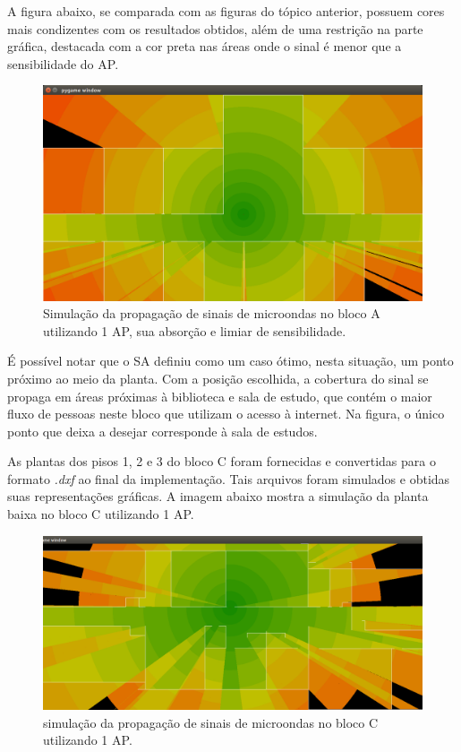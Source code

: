 \documentclass[
	12pt,				%
	openright,			%
	twoside,			%
	a4paper,			%
	english,			%
	french,				%
	spanish,			%
	brazil				%
	]{abntex2}
\begin{document}
A figura abaixo, se comparada com as figuras do tópico anterior, possuem cores mais condizentes com os resultados obtidos, além de uma restrição na parte gráfica, destacada com a cor preta nas áreas onde o sinal é menor que a sensibilidade do AP.

\begin{figure}[ht]
	\caption{\label{prop-bloco-a}Simulação da propagação de sinais de microondas no bloco A utilizando 1 AP, sua absorção e limiar de sensibilidade.}
	\begin{center}
		\includegraphics[scale=0.4]{images/prop-bloco-a.jpg}
	\end{center}
\end{figure}

É possível notar que o SA definiu como um caso ótimo, nesta situação, um ponto próximo ao meio da planta. Com a posição escolhida, a cobertura do sinal se propaga em áreas próximas à biblioteca e sala de estudo, que contém o maior fluxo de pessoas neste bloco que utilizam o acesso à internet. Na figura, o único ponto que deixa a desejar corresponde à sala de estudos.

As plantas dos pisos 1, 2 e 3 do bloco C foram fornecidas e convertidas para o formato \textit{.dxf }ao final da implementação. Tais arquivos foram simulados e obtidas suas representações gráficas. A imagem abaixo mostra a simulação da planta baixa no bloco C utilizando 1 AP.

\begin{figure}[ht]
	\caption{\label{captura-zona}simulação da propagação de sinais de microondas no bloco C utilizando 1 AP.
		}
	\begin{center}
		\includegraphics[scale=0.4]{images/captura-zona.jpg}
	\end{center}
\end{figure}
\end{document}
